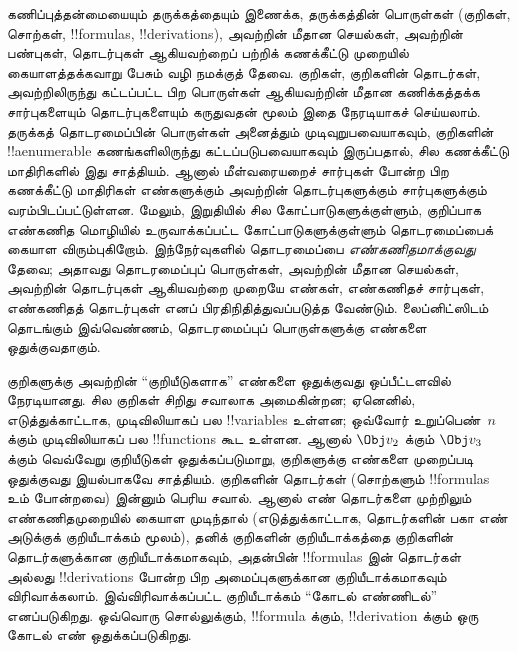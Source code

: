 \documentclass[../../../include/open-logic-section]{subfiles}
\begin{document}


கணிப்புத்தன்மையையும் தருக்கத்தையும் இணைக்க, தருக்கத்தின் பொருள்கள் (குறிகள்,
சொற்கள், !!{formula}s, !!{derivation}s), அவற்றின் மீதான செயல்கள்,
அவற்றின் பண்புகள், தொடர்புகள் ஆகியவற்றைப் பற்றிக் கணக்கீட்டு முறையில்
கையாளத்தக்கவாறு பேசும் வழி நமக்குத் தேவை. குறிகள், குறிகளின் தொடர்கள்,
அவற்றிலிருந்து கட்டப்பட்ட பிற பொருள்கள் ஆகியவற்றின் மீதான கணிக்கத்தக்க
சார்புகளையும் தொடர்புகளையும் கருதுவதன் மூலம் இதை நேரடியாகச் செய்யலாம்.
தருக்கத் தொடரமைப்பின் பொருள்கள் அனைத்தும் முடிவுறுபவையாகவும், குறிகளின்
!!a{enumerable} கணங்களிலிருந்து கட்டப்படுபவையாகவும் இருப்பதால், சில
கணக்கீட்டு மாதிரிகளில் இது சாத்தியம். ஆனால் மீள்வரையறைச் சார்புகள் போன்ற
பிற கணக்கீட்டு மாதிரிகள் எண்களுக்கும் அவற்றின் தொடர்புகளுக்கும் சார்புகளுக்கும்
வரம்பிடப்பட்டுள்ளன. மேலும், இறுதியில் சில கோட்பாடுகளுக்குள்ளும், குறிப்பாக
எண்கணித மொழியில் உருவாக்கப்பட்ட கோட்பாடுகளுக்குள்ளும் தொடரமைப்பைக் கையாள
விரும்புகிறோம். இந்நேர்வுகளில் தொடரமைப்பை \emph{எண்கணிதமாக்குவது} தேவை;
அதாவது தொடரமைப்புப் பொருள்கள், அவற்றின் மீதான செயல்கள், அவற்றின் தொடர்புகள்
ஆகியவற்றை முறையே எண்கள், எண்கணிதச் சார்புகள், எண்கணிதத் தொடர்புகள் எனப்
பிரதிநிதித்துவப்படுத்த வேண்டும். லைப்னிட்ஸிடம் தொடங்கும் இவ்வெண்ணம்,
தொடரமைப்புப் பொருள்களுக்கு எண்களை ஒதுக்குவதாகும்.

குறிகளுக்கு அவற்றின் ``குறியீடுகளாக'' எண்களை ஒதுக்குவது ஒப்பீட்டளவில்
நேரடியானது. சில குறிகள் சிறிது சவாலாக அமைகின்றன; ஏனெனில், எடுத்துக்காட்டாக,
முடிவிலியாகப் பல !!{variable}s உள்ளன; ஒவ்வோர் உறுப்பெண்~$n$ க்கும்
முடிவிலியாகப் பல !!{function}s கூட உள்ளன. ஆனால் $\Obj v_2$ க்கும்
$\Obj v_3$ க்கும் வெவ்வேறு குறியீடுகள் ஒதுக்கப்படுமாறு, குறிகளுக்கு எண்களை
முறைப்படி ஒதுக்குவது இயல்பாகவே சாத்தியம். குறிகளின் தொடர்கள் (சொற்களும்
!!{formula}s உம் போன்றவை) இன்னும் பெரிய சவால். ஆனால் எண் தொடர்களை
முற்றிலும் எண்கணிதமுறையில் கையாள முடிந்தால் (எடுத்துக்காட்டாக, தொடர்களின்
பகா எண் அடுக்குக் குறியீடாக்கம் மூலம்), தனிக் குறிகளின் குறியீடாக்கத்தை
குறிகளின் தொடர்களுக்கான குறியீடாக்கமாகவும், அதன்பின் !!{formula}s இன்
தொடர்கள் அல்லது !!{derivation}s போன்ற பிற அமைப்புகளுக்கான குறியீடாக்கமாகவும்
விரிவாக்கலாம். இவ்விரிவாக்கப்பட்ட குறியீடாக்கம் ``கோடல் எண்ணிடல்''
எனப்படுகிறது. ஒவ்வொரு சொல்லுக்கும், !!{formula} க்கும்,
!!{derivation} க்கும் ஒரு கோடல் எண் ஒதுக்கப்படுகிறது.
\end{document}
